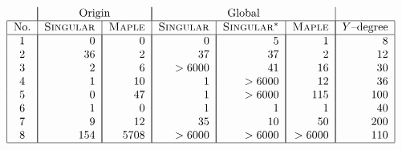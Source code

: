 \documentclass[a4paper,11pt]{amsart}%
\theoremstyle{definition}
\theoremstyle{plain}
\theoremstyle{remark}
\begin{document}
\[%
\begin{tabular}
[c]{c|c|c|c|c|c|c}
& \multicolumn{2}{|c|}{Origin} & \multicolumn{3}{|c|}{Global} & \\\hline
\multicolumn{1}{|c|}{No.} & \textsc{Singular} & \textsc{Maple} &
\textsc{Singular}{} & \textsc{Singular}{}$^{*}$ & \textsc{Maple} &
\multicolumn{1}{|l|}{$Y$--degree}\\\hline
\multicolumn{1}{|c|}{$1$} & \multicolumn{1}{|r|}{$0$} &
\multicolumn{1}{|r|}{$0$} & \multicolumn{1}{|r|}{$0$} &
\multicolumn{1}{|r|}{$5$} & \multicolumn{1}{|r|}{$1$} &
\multicolumn{1}{|r|}{$8$}\\
\multicolumn{1}{|c|}{$2$} & \multicolumn{1}{|r|}{$36$} &
\multicolumn{1}{|r|}{$2$} & \multicolumn{1}{|r|}{$37$} &
\multicolumn{1}{|r|}{$37$} & \multicolumn{1}{|r|}{$2$} &
\multicolumn{1}{|r|}{$12$}\\
\multicolumn{1}{|c|}{$3$} & \multicolumn{1}{|r|}{$2$} &
\multicolumn{1}{|r|}{$6$} & \multicolumn{1}{|r|}{$>6000$} &
\multicolumn{1}{|r|}{$41$} & \multicolumn{1}{|r|}{$16$} &
\multicolumn{1}{|r|}{$30$}\\
\multicolumn{1}{|c|}{$4$} & \multicolumn{1}{|r|}{$1$} &
\multicolumn{1}{|r|}{$10$} & \multicolumn{1}{|r|}{$1$} &
\multicolumn{1}{|r|}{$>6000$} & \multicolumn{1}{|r|}{$12$} &
\multicolumn{1}{|r|}{$36$}\\
\multicolumn{1}{|c|}{$5$} & \multicolumn{1}{|r|}{$0$} &
\multicolumn{1}{|r|}{$47$} & \multicolumn{1}{|r|}{$1$} &
\multicolumn{1}{|r|}{$>6000$} & \multicolumn{1}{|r|}{$115$} &
\multicolumn{1}{|r|}{$100$}\\
\multicolumn{1}{|c|}{$6$} & \multicolumn{1}{|r|}{$1$} &
\multicolumn{1}{|r|}{$0$} & \multicolumn{1}{|r|}{$1$} &
\multicolumn{1}{|r|}{$1$} & \multicolumn{1}{|r|}{$1$} &
\multicolumn{1}{|r|}{$40$}\\
\multicolumn{1}{|c|}{$7$} & \multicolumn{1}{|r|}{$9$} &
\multicolumn{1}{|r|}{$12$} & \multicolumn{1}{|r|}{$35$} &
\multicolumn{1}{|r|}{$10$} & \multicolumn{1}{|r|}{$50$} &
\multicolumn{1}{|r|}{$200$}\\
\multicolumn{1}{|c|}{$8$} & \multicolumn{1}{|r|}{$154$} &
\multicolumn{1}{|r|}{$5708$} & \multicolumn{1}{|r|}{$>6000$} &
\multicolumn{1}{|r|}{$>6000$} & \multicolumn{1}{|r|}{$>6000$} &
\multicolumn{1}{|r|}{$110$}\\\hline
\end{tabular}
\
\]
\end{document}
